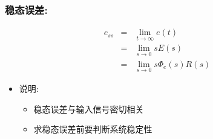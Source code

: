 \documentclass{article}
\begin{document}
\begin{frame}
\frametitle{稳态误差:}
\label{sec-3-1-3}

\begin{eqnarray*}
e_{ss} &=& \lim_{t\rightarrow \infty}e(t) \\
       &=& \lim_{s\rightarrow 0}sE(s)  \\
       &= & \lim_{s\rightarrow 0}s\Phi_{e}(s)R(s)
\end{eqnarray*}

\begin{itemize}
\item <2->说明:
\begin{itemize}
\item <2->稳态误差与输入信号密切相关
\item <3->求稳态误差前要判断系统稳定性
\end{itemize}
\end{itemize}
\end{frame}
\end{document}
